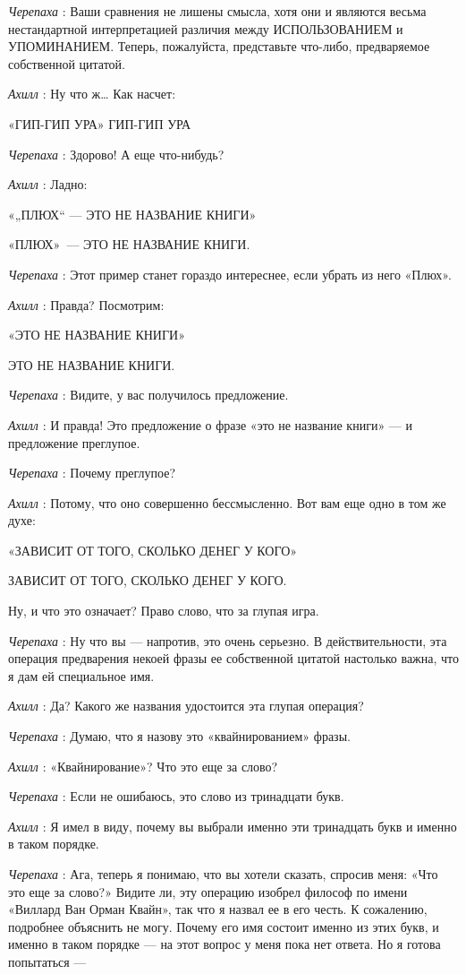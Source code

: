 \documentclass[../main.tex]{subfiles}
\begin{document}
\begin{dialogue}
\emph{Черепаха} : Ваши сравнения не лишены смысла, хотя они и являются весьма нестандартной интерпретацией различия между ИСПОЛЬЗОВАНИЕМ и УПОМИНАНИЕМ. Теперь, пожалуйста, представьте что-либо, предваряемое собственной цитатой.

\emph{Ахилл} : Ну что ж\ldots{} Как насчет:

«ГИП-ГИП УРА» ГИП-ГИП УРА

\emph{Черепаха} : Здорово! А еще что-нибудь?

\emph{Ахилл} : Ладно:

«„ПЛЮХ`` --- ЭТО НЕ НАЗВАНИЕ КНИГИ»

«ПЛЮХ»~--- ЭТО НЕ НАЗВАНИЕ КНИГИ.

\emph{Черепаха} : Этот пример станет гораздо интереснее, если убрать из него «Плюх».

\emph{Ахилл} : Правда? Посмотрим:

«ЭТО НЕ НАЗВАНИЕ КНИГИ»

ЭТО НЕ НАЗВАНИЕ КНИГИ.

\emph{Черепаха} : Видите, у вас получилось предложение.

\emph{Ахилл} : И правда! Это предложение о фразе «это не название книги» --- и предложение преглупое.

\emph{Черепаха} : Почему преглупое?

\emph{Ахилл} : Потому, что оно совершенно бессмысленно. Вот вам еще одно в том же духе:

«ЗАВИСИТ ОТ ТОГО, СКОЛЬКО ДЕНЕГ У КОГО»

ЗАВИСИТ ОТ ТОГО, СКОЛЬКО ДЕНЕГ У КОГО.

Ну, и что это означает? Право слово, что за глупая игра.

\emph{Черепаха} : Ну что вы --- напротив, это очень серьезно. В действительности, эта операция предварения некоей фразы ее собственной цитатой настолько важна, что я дам ей специальное имя.

\emph{Ахилл} : Да? Какого же названия удостоится эта глупая операция?

\emph{Черепаха} : Думаю, что я назову это «квайнированием» фразы.

\emph{Ахилл} : «Квайнирование»? Что это еще за слово?

\emph{Черепаха} : Если не ошибаюсь, это слово из тринадцати букв.

\emph{Ахилл} : Я имел в виду, почему вы выбрали именно эти тринадцать букв и именно в таком порядке.

\emph{Черепаха} : Ага, теперь я понимаю, что вы хотели сказать, спросив меня: «Что это еще за слово?» Видите ли, эту операцию изобрел философ по имени «Виллард Ван Орман Квайн», так что я назвал ее в его честь. К сожалению, подробнее объяснить не могу. Почему его имя состоит именно из этих букв, и именно в таком порядке --- на этот вопрос у меня пока нет ответа. Но я готова попытаться ---


\end{dialogue}
\end{document}
